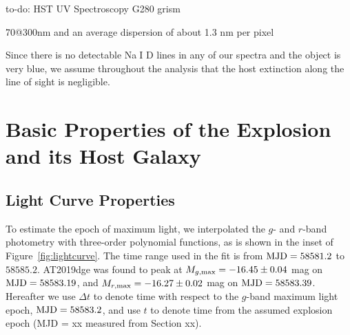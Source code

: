 \documentclass[twocolumn]{aastex63}
\def\ion#1#2{#1$\;${\footnotesize\rm{#2}}\relax}
\newcommand{\todo}[1]{{\color{magenta} to-do: {#1}}}
\begin{document}
\begin{CJK*}{UTF8}{gbsn}
\todo{HST UV Spectroscopy}
G280 grism

70@300nm and an average dispersion of about 1.3 nm per pixel

Since there is no detectable \ion{Na}{I} D lines in any of our spectra and the object is very blue, we 
assume throughout the analysis that the host extinction along the line of sight is negligible.


\section{Basic Properties of the Explosion \\and its Host Galaxy}
\subsection{Light Curve Properties}\label{subsec:lc_properties}

To estimate the epoch of maximum light, we interpolated the $g$- and $r$-band photometry with 
three-order polynomial functions, as is shown in the inset of Figure~\ref{fig:lightcurve}. The time range 
used in the fit is from ${\rm MJD}=58581.2$ to $58585.2$. AT2019dge was found to peak 
at $M_{g, \rm max}=-16.45\pm0.04$ mag on ${\rm MJD}=58583.19$, and $M_{r, \rm 
max}=-16.27\pm0.02$ mag on ${\rm MJD}=58583.39$. Hereafter we use $\Delta t$ to denote time
with respect to the $g$-band maximum light epoch, ${\rm MJD}=58583.2$, and use $t$ to denote time 
from the assumed explosion epoch (MJD = xx measured from Section xx).


\end{CJK*}
\end{document}
